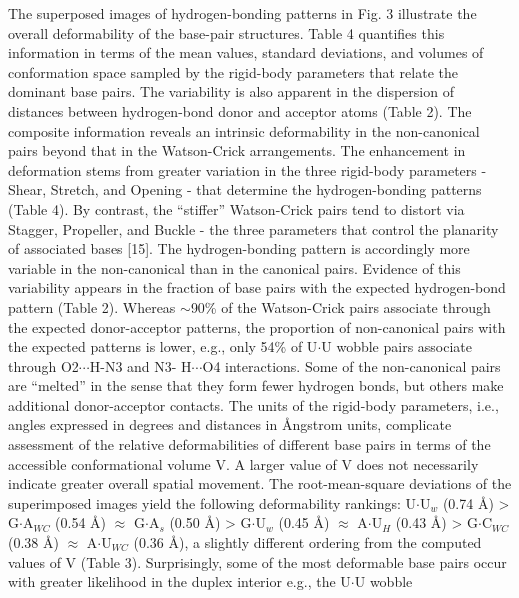 The  superposed   images  of  hydrogen-bonding  patterns   in  Fig.  3
illustrate  the  overall deformability  of  the base-pair  structures.
Table  4 quantifies  this information  in  terms of  the mean  values,
standard deviations, and volumes  of conformation space sampled by the
rigid-body  parameters  that  relate  the dominant  base  pairs.   The
variability is  also apparent in  the dispersion of  distances between
hydrogen-bond  donor  and acceptor  atoms  (Table  2).  The  composite
information  reveals an intrinsic  deformability in  the non-canonical
pairs beyond  that in the Watson-Crick  arrangements.  The enhancement
in deformation  stems from greater  variation in the  three rigid-body
parameters  -  Shear,  Stretch,  and  Opening  -  that  determine  the
hydrogen-bonding  patterns  (Table 4).  By  contrast, the  ``stiffer''
Watson-Crick pairs tend to  distort via Stagger, Propeller, and Buckle
- the three parameters that  control the planarity of associated bases
[15]. The hydrogen-bonding pattern is accordingly more variable in the
non-canonical  than   in  the   canonical  pairs.  Evidence   of  this
variability appears  in the fraction  of base pairs with  the expected
hydrogen-bond   pattern   (Table  2).   Whereas   $\sim$90\%  of   the
Watson-Crick  pairs  associate  through  the  expected  donor-acceptor
patterns,  the proportion  of  non-canonical pairs  with the  expected
patterns is lower, e.g., only 54\% of U$\cdot$U wobble pairs associate
through O2$\cdots$H-N3  and N3- H$\cdots$O4 interactions.  Some of the
non-canonical pairs are  ``melted'' in the sense that  they form fewer
hydrogen   bonds,   but    others   make   additional   donor-acceptor
contacts.  The  units  of  the  rigid-body  parameters,  i.e.,  angles
expressed  in  degrees and  distances  in  Ångstrom units,  complicate
assessment of the relative  deformabilities of different base pairs in
terms of the  accessible conformational volume V. A  larger value of V
does not  necessarily indicate  greater overall spatial  movement. The
root-mean-square  deviations  of  the  superimposed images  yield  the
following  deformability   rankings:  U$\cdot$U$_{w}$  (0.74   \AA)  >
G$\cdot$A$_{WC}$  (0.54 \AA)  $\approx$ G$\cdot$A$_{s}$  (0.50  \AA) >
G$\cdot$U$_{w}$  (0.45  \AA) $\approx$  A$\cdot$U$_{H}$  (0.43 \AA)  >
G$\cdot$C$_{WC}$ (0.38  \AA) $\approx$ A$\cdot$U$_{WC}$  (0.36 \AA), a
slightly  different ordering  from  the computed  values  of V  (Table
3). Surprisingly,  some of the  most deformable base pairs  occur with
greater likelihood  in the duplex interior e.g.,  the U$\cdot$U wobble
